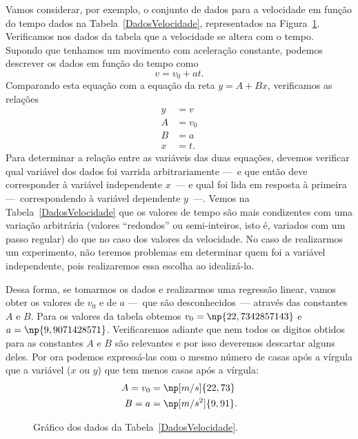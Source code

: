 Vamos considerar, por exemplo, o conjunto de dados para a velocidade em função do tempo dados na Tabela~\ref{DadosVelocidade}, representados na Figura~\ref{fig:VelocidadeTempo}. Verificamos nos dados da tabela que a velocidade se altera com o tempo. Supondo que tenhamos um movimento com aceleração constante, podemos descrever os dados em função do tempo como
\begin{equation}
	v = v_0 + at.
\end{equation}
%
Comparando esta equação com a equação da reta $y = A + Bx$, verificamos as relações
\begin{align}
	y &= v \\
	A &= v_0 \\
	B &= a \\
	x &= t.
\end{align}
%
Para determinar a relação entre as variáveis das duas equações, devemos verificar qual variável dos dados foi varrida arbitrariamente ---~e que então deve corresponder à variável independente $x$~--- e qual foi lida em resposta à primeira ---~correspondendo à variável dependente $y$~---. Vemos na Tabela~\ref{DadosVelocidade} que os valores de tempo são mais condizentes com uma variação arbitrária (valores ``redondos'' ou semi-inteiros, isto é, variados com um passo regular) do que no caso dos valores da velocidade. No caso de realizarmos um experimento, não teremos problemas em determinar quem foi a variável independente, pois realizaremos essa escolha ao idealizá-lo.

Dessa forma, se tomarmos os dados e realizarmos uma regressão linear, vamos obter os valores de $v_0$ e de $a$ ---~que são desconhecidos~--- através das constantes $A$ e $B$. Para os valores da tabela obtemos $v_0 = \np{22,734 285 714 3}$ e $a = \np{9,907 142 857 1}$. Verificaremos adiante que nem todos os digitos obtidos para as constantes $A$ e $B$ são relevantes e por isso deveremos descartar alguns deles. Por ora podemos expressá-las com o mesmo número de casas após a vírgula que a variável ($x$ ou $y$) que tem menos casas após a vírgula:
\begin{align}
	A = v_0 &= \np[m/s]{22,73} \\
	B = a &= \np[m/s^2]{9,91}.
\end{align}

\begin{figure}[!htbt]
\centering
\caption{Gráfico dos dados da Tabela~\ref{DadosVelocidade}.} 
\label{fig:VelocidadeTempo}

\end{figure}


